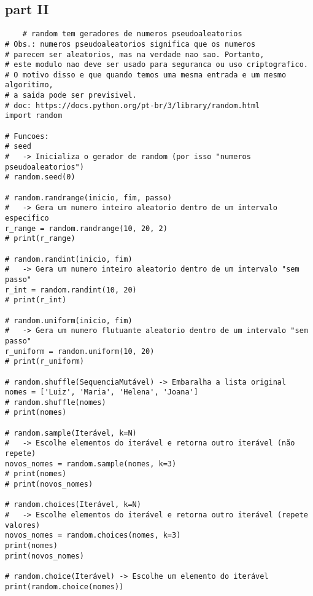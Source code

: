 \documentclass{article}
\begin{document}
\subsection{part II}
\begin{lstlisting}
    # random tem geradores de numeros pseudoaleatorios
# Obs.: numeros pseudoaleatorios significa que os numeros
# parecem ser aleatorios, mas na verdade nao sao. Portanto,
# este modulo nao deve ser usado para seguranca ou uso criptografico.
# O motivo disso e que quando temos uma mesma entrada e um mesmo algoritimo,
# a saida pode ser previsivel.
# doc: https://docs.python.org/pt-br/3/library/random.html
import random

# Funcoes:
# seed
#   -> Inicializa o gerador de random (por isso "numeros pseudoaleatorios")
# random.seed(0)

# random.randrange(inicio, fim, passo)
#   -> Gera um numero inteiro aleatorio dentro de um intervalo especifico
r_range = random.randrange(10, 20, 2)
# print(r_range)

# random.randint(inicio, fim)
#   -> Gera um numero inteiro aleatorio dentro de um intervalo "sem passo"
r_int = random.randint(10, 20)
# print(r_int)

# random.uniform(inicio, fim)
#   -> Gera um numero flutuante aleatorio dentro de um intervalo "sem passo"
r_uniform = random.uniform(10, 20)
# print(r_uniform)

# random.shuffle(SequenciaMutável) -> Embaralha a lista original
nomes = ['Luiz', 'Maria', 'Helena', 'Joana']
# random.shuffle(nomes)
# print(nomes)

# random.sample(Iterável, k=N)
#   -> Escolhe elementos do iterável e retorna outro iterável (não repete)
novos_nomes = random.sample(nomes, k=3)
# print(nomes)
# print(novos_nomes)

# random.choices(Iterável, k=N)
#   -> Escolhe elementos do iterável e retorna outro iterável (repete valores)
novos_nomes = random.choices(nomes, k=3)
print(nomes)
print(novos_nomes)

# random.choice(Iterável) -> Escolhe um elemento do iterável
print(random.choice(nomes))
\end{lstlisting}
\end{document}
